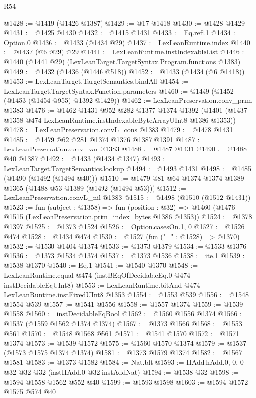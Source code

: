 \begin{lexlean}{R54}
\begin{coremodule}
{{{{{{{{{{{{{{{{{{{{{{{{{{{{{{{{{{{{{{{{{{{{{{{{{{@1428 := @1419 (@1426 @1387)
@1429 := @17 @1418
@1430 := @1428 @1429
@1431 := @1425 @1430
@1432 := @1415 @1431
@1433 := Eq.refl.{1}
@1434 := Option.{0}
@1436 := @1433 (@1434 @29)
@1437 := LexLeanRuntime.index
@1440 := @1437 (@6 @29) @29
@1441 := LexLeanRuntime.instIndexableList
@1446 := @1440 (@1441 @29) (LexLeanTarget.TargetSyntax.Program.functions @1383)
@1449 := @1432 (@1436 (@1446 @518))
@1452 := @1433 (@1434 (@6 @1418))
@1453 := LexLeanTarget.TargetSemantics.bindAll
@1454 := LexLeanTarget.TargetSyntax.Function.parameters
@1460 := @1449 (@1452 (@1453 (@1454 @955) @1392 @1429))
@1462 := LexLeanPreservation.conv_prim @1383
@1476 := @1462
    @1431
    @952
    @282
    @1377
    @1374
    @1392
    (@1401 (@1437 @1358 @474 LexLeanRuntime.instIndexableByteArrayUInt8 @1386 @1353))
@1478 := LexLeanPreservation.convL_cons @1383
@1479 := @1478 @1431
@1485 := @1479 @62 @281 @1374 @1376 @1387 @1391
@1487 := LexLeanPreservation.conv_var @1383
@1488 := @1487 @1431
@1490 := @1488 @40 @1387
@1492 := @1433 (@1434 @1347)
@1493 := LexLeanTarget.TargetSemantics.lookup
@1494 := @1493 @1431
@1498 := @1485 (@1490 (@1492 (@1494 @40)))
@1510 := @1479 @81 @64 @1374 @1374 @1389 @1365 (@1488 @53 @1389 (@1492 (@1494 @53)))
@1512 := LexLeanPreservation.convL_nil @1383
@1515 := @1498 (@1510 (@1512 @1431))
@1523 := fun (subject : @1358) =>
  fun (position : @32) => @1460 (@1476 @1515 (LexLeanPreservation.prim_index_bytes @1386 @1353))
@1524 := @1378 @1397
@1525 := @1373 @1524
@1526 := Option.casesOn.{1, 0}
@1527 := @1526 @474
@1528 := @1434 @474
@1530 := @1527 (fun ("_" : @1528) => @1370)
@1532 := @1530 @1404 @1374
@1533 := @1373 @1379
@1534 := @1533 @1376
@1536 := @1373 @1534 @1374
@1537 := @1373 @1536
@1538 := ite.{1}
@1539 := @1538 @1370
@1540 := Eq.{1}
@1541 := @1540 @1370
@1548 := LexLeanRuntime.equal @474 (instBEqOfDecidableEq.{0} @474 instDecidableEqUInt8)
@1553 := LexLeanRuntime.bitAnd @474 LexLeanRuntime.instFixedUInt8 @1353
@1554 := @1553 @539
@1556 := @1548 @1554 @539
@1557 := @1541 @1556
@1558 := @1557 @1374
@1559 := @1539 @1558
@1560 := instDecidableEqBool
@1562 := @1560 @1556 @1374
@1566 := @1537 (@1559 @1562 @1374 @1374)
@1567 := @1373 @1566
@1568 := @1553 @561
@1570 := @1548 @1568 @561
@1571 := @1541 @1570
@1572 := @1571 @1374
@1573 := @1539 @1572
@1575 := @1560 @1570 @1374
@1579 := @1537 (@1573 @1575 @1374 @1374)
@1581 := @1373 @1579 @1374
@1582 := @1567 @1581
@1583 := @1373 @1582
@1584 := Nat.blt
@1593 := HAdd.hAdd.{0, 0, 0} @32 @32 @32 (instHAdd.{0} @32 instAddNat)
@1594 := @1538 @32
@1598 := @1594 @1558 @1562 @552 @40
@1599 := @1593 @1598
@1603 := @1594 @1572 @1575 @574 @40
}}}}}}}}}}}}}}}}}}}}}}}}}}}}}}}}}}}}}}}}}}}}}}}}}}
\end{coremodule}
\end{lexlean}
